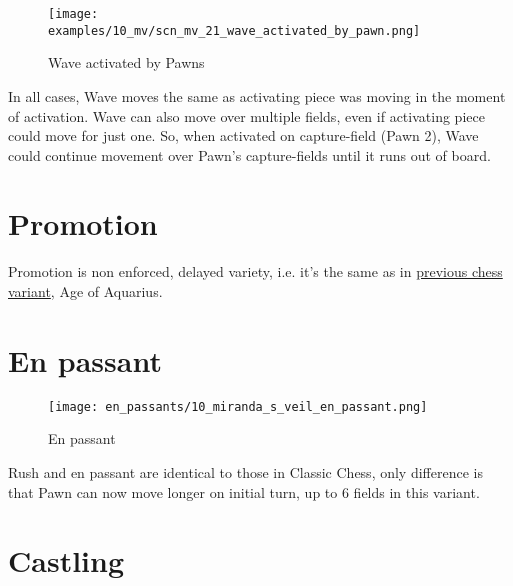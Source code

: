 \clearpage %

\noindent
\begin{figure}[!h]
\texttt{[image: examples/10\_mv/scn\_mv\_21\_wave\_activated\_by\_pawn.png]}
\caption{Wave activated by Pawns}
\label{fig:scn_mv_21_wave_activated_by_pawn}
\end{figure}

In all cases, Wave moves the same as activating piece was moving in the moment of
activation. Wave can also move over multiple fields, even if activating piece could
move for just one. So, when activated on capture-field (Pawn 2), Wave could continue
movement over Pawn's capture-fields until it runs out of board.

\clearpage %

\section*{Promotion}

Promotion is non enforced, delayed variety, i.e. it's the same as in
\hyperref[sec:Age of Aquarius/Promotion]{previous chess variant}, Age of Aquarius.

\clearpage %

\section*{En passant}

\noindent
\begin{wrapfigure}{l}{0.4\textwidth}
\centering
\texttt{[image: en\_passants/10\_miranda\_s\_veil\_en\_passant.png]}
\caption{En passant}
\label{fig:10_miranda_s_veil_en_passant}
\end{wrapfigure}
Rush and en passant are identical to those in Classic Chess, only difference
is that Pawn can now move longer on initial turn, up to 6 fields in this
variant.

\clearpage %

\section*{Castling}

